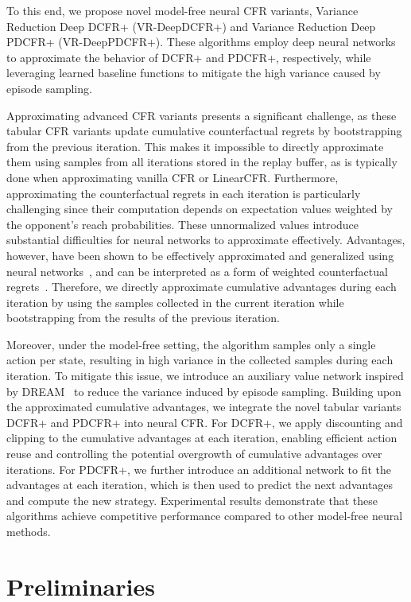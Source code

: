 \documentclass[letterpaper]{article} %
\begin{document}
To this end, we propose novel model-free neural CFR variants, Variance Reduction Deep DCFR+ (VR-DeepDCFR+) and Variance Reduction Deep PDCFR+ (VR-DeepPDCFR+). These algorithms employ deep neural networks to approximate the behavior of DCFR+ and PDCFR+, respectively, while leveraging learned baseline functions to mitigate the high variance caused by episode sampling. 

Approximating advanced CFR variants presents a significant challenge, as these tabular CFR variants update cumulative counterfactual regrets by bootstrapping from the previous iteration. This makes it impossible to directly approximate them using samples from all iterations stored in the replay buffer, as is typically done when approximating vanilla CFR or LinearCFR. Furthermore, approximating the counterfactual regrets in each iteration is particularly challenging since their computation depends on expectation values weighted by the opponent's reach probabilities. These unnormalized values introduce substantial difficulties for neural networks to approximate effectively. Advantages, however, have been shown to be effectively approximated and generalized using neural networks~\cite{schulman2017proximal}, and can be interpreted as a form of weighted counterfactual regrets~\cite{srinivasan2018actor}. Therefore, we directly approximate cumulative advantages during each iteration by using the samples collected in the current iteration while bootstrapping from the results of the previous iteration.

Moreover, under the model-free setting, the algorithm samples only a single action per state, resulting in high variance in the collected samples during each iteration. 
To mitigate this issue, we introduce an auxiliary value network inspired by DREAM~\cite{steinberger2020dream} to reduce the variance induced by episode sampling. 
Building upon the approximated cumulative advantages, we integrate the novel tabular variants DCFR+ and PDCFR+ into neural CFR. For DCFR+, we apply discounting and clipping to the cumulative advantages at each iteration, enabling efficient action reuse and controlling the potential overgrowth of cumulative advantages over iterations. For PDCFR+, we further introduce an additional network to fit the advantages at each iteration, which is then used to predict the next advantages and compute the new strategy. Experimental results demonstrate that these algorithms achieve competitive performance compared to other model-free neural methods.

\section{Preliminaries}
\end{document}
